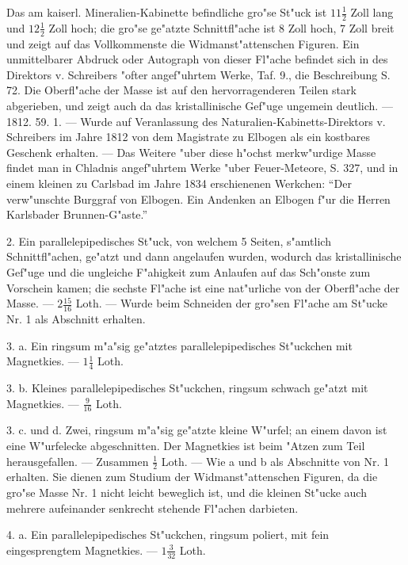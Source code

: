 \documentclass[a4paper, 11pt, oneside, polutonikogreek, german]{article}
\begin{document}
\setlength{\leftskip}{0pt}
\setlength{\parindent}{20pt}

Das am kaiserl. Mineralien-Kabinette befindliche gro"se St"uck ist $\mathfrak{11\frac{1}{2}}$ Zoll lang und $\mathfrak{12\frac{1}{2}}$ Zoll hoch; die gro"se ge"atzte Schnittfl"ache ist 8 Zoll hoch, 7 Zoll breit und zeigt auf das Vollkommenste die Widmanst"attenschen Figuren. Ein unmittelbarer Abdruck oder Autograph von dieser Fl"ache befindet sich in des Direktors v. Schreibers "ofter angef"uhrtem Werke, Taf. 9., die Beschreibung S. 72. Die Oberfl"ache der Masse ist auf den hervorragenderen Teilen stark abgerieben, und zeigt auch da das kristallinische Gef"uge ungemein deutlich. --- 1812. 59. 1. --- Wurde auf Veranlassung des Naturalien-Kabinetts-Direktors v. Schreibers im Jahre 1812 von dem Magistrate zu Elbogen als ein kostbares Geschenk erhalten. --- Das Weitere "uber diese h"ochst merkw"urdige Masse findet man in Chladnis angef"uhrtem Werke "uber Feuer-Meteore, S. 327, und in einem kleinen zu Carlsbad im Jahre 1834 erschienenen Werkchen: "`Der verw"unschte Burggraf von Elbogen. Ein Andenken an Elbogen f"ur die Herren Karlsbader Brunnen-G"aste."'

2. Ein parallelepipedisches St"uck, von welchem 5 Seiten, s"amtlich Schnittfl"achen, ge"atzt und dann angelaufen wurden, wodurch das kristallinische Gef"uge und die ungleiche F"ahigkeit zum Anlaufen auf das Sch"onste zum Vorschein kamen; die sechste Fl"ache ist eine nat"urliche von der Oberfl"ache der Masse. --- $\mathfrak{2\frac{15}{16}}$ Loth. --- Wurde beim Schneiden der gro"sen Fl"ache am St"ucke Nr. 1 als Abschnitt erhalten.

3. a. Ein ringsum m"a"sig ge"atztes parallelepipedisches St"uckchen mit Magnetkies. --- $\mathfrak{1\frac{1}{4}}$ Loth.

3. b. Kleines parallelepipedisches St"uckchen, ringsum schwach ge"atzt mit Magnetkies. --- $\mathfrak{\frac{9}{16}}$ Loth.

3. c. und d. Zwei, ringsum m"a"sig ge"atzte kleine W"urfel; an einem davon ist eine W"urfelecke abgeschnitten. Der Magnetkies ist beim "Atzen zum Teil herausgefallen. --- Zusammen $\mathfrak{\frac{1}{2}}$ Loth. --- Wie a und b als Abschnitte von Nr. 1 erhalten. Sie dienen zum Studium der Widmanst"attenschen Figuren, da die gro"se Masse Nr. 1 nicht leicht beweglich ist, und die kleinen St"ucke auch mehrere aufeinander senkrecht stehende Fl"achen darbieten.

4. a. Ein parallelepipedisches St"uckchen, ringsum poliert, mit fein eingesprengtem Magnetkies. --- $\mathfrak{1\frac{3}{32}}$ Loth.
\end{document}
